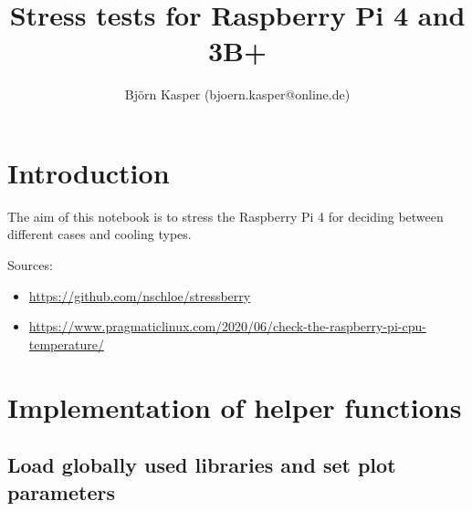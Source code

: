 \documentclass[11pt]{article}
\title{Stress tests for Raspberry Pi 4 and 3B+}
\author{Björn Kasper (bjoern.kasper@online.de)}
\providecommand{\tightlist}{%
      \setlength{\itemsep}{0pt}\setlength{\parskip}{0pt}}
\begin{document}
    
    \maketitle
    
    

    
    \hypertarget{introduction}{%
\section{Introduction}\label{introduction}}

The aim of this notebook is to stress the Raspberry Pi 4 for deciding
between different cases and cooling types.

Sources:

\begin{itemize}
\tightlist
\item
  \url{https://github.com/nschloe/stressberry}
\item
  \url{https://www.pragmaticlinux.com/2020/06/check-the-raspberry-pi-cpu-temperature/}
\end{itemize}

    \hypertarget{implementation-of-helper-functions}{%
\section{Implementation of helper
functions}\label{implementation-of-helper-functions}}

\hypertarget{load-globally-used-libraries-and-set-plot-parameters}{%
\subsection{Load globally used libraries and set plot
parameters}\label{load-globally-used-libraries-and-set-plot-parameters}}
\end{document}
